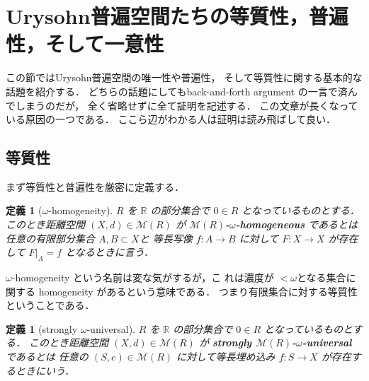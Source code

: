 \documentclass[leqno, 12pt]{jsarticle}
\newtheorem{df}[thm]{定義}
\newcommand{\rr}{\mathbb{R}}
\begin{document}



\newpage
\section{Urysohn普遍空間たちの等質性，普遍性，そして一意性}\label{sec:uryunique}

この節ではUrysohn普遍空間の唯一性や普遍性，
そして等質性に関する基本的な
話題を紹介する．
どちらの話題にしてもback-and-forth argument
の一言で済んでしまうのだが，
全く省略せずに全て証明を記述する．
この文章が長くなっている原因の一つである．
ここら辺がわかる人は証明は読み飛ばして良い．

\subsection{等質性}
まず等質性と普遍性を厳密に定義する．

\begin{df}[$\omega$-homogeneity]\label{df:pp:hom}
$R$
を
$\rr$
の部分集合で
$0\in R$
となっているものとする．
このとき距離空間
$(X, d)\in \mathscr{M}(R)$
が
\textbf{$\mathscr{M}(R)$-$\omega$-homogeneous}
であるとは
任意の有限部分集合
$A, B\subset  X$と
等長写像
$f\colon  A\to B$
に対して
$F\colon X\to X$
が存在して
$F|_{A}=f$
となるときに言う．
\end{df}
$\omega$-homogeneity
という名前は変な気がするが，こ
れは濃度が
$<\omega$となる集合に関する
homogeneity
があるという意味である．
つまり有限集合に対する等質性ということである．





\begin{df}[strongly $\omega$-universal]\label{df:pp:univ}
$R$
を
$\rr$
の部分集合で
$0\in R$
となっているものとする．
このとき距離空間
$(X, d)\in \mathscr{M}(R)$
が
\textbf{strongly $\mathscr{M}(R)$-$\omega$-universal}
であるとは
任意の
$(S, e)\in \mathscr{M}(R)$
に対して等長埋め込み
$f\colon S\to X$
が存在するときにいう．
\end{df}
\end{document}
